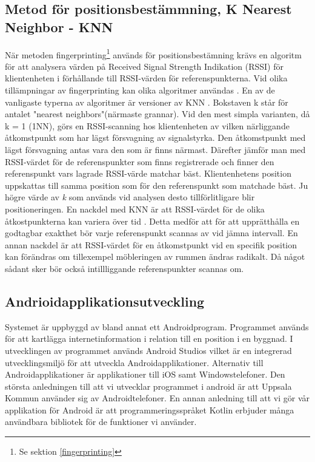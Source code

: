 \documentclass[swedish, a4paper,12pt]{article}
\begin{document}
\subsection{Metod för positionsbestämmning, K Nearest Neighbor - KNN}\label{KNN}
När metoden fingerprinting\footnote{Se sektion \ref{fingerprinting}} används för positionsbestämning krävs en algoritm för att analysera värden på Received Signal Strength Indikation (RSSI) för klientenheten i förhållande till RSSI-värden för referenspunkterna. Vid olika tillämpningar av fingerprinting kan olika algoritmer användas \cite{tian2013fingerprint}\cite{jun2018low}. En av de vanligaste typerna av algoritmer är versioner av KNN \cite{tian2013fingerprint}.
Bokstaven k står för antalet "nearest neighbors"(närmaste grannar). Vid den mest simpla varianten, då k = 1 (1NN), görs en RSSI-scanning hos klientenheten av vilken närliggande åtkomstpunkt som har lägst försvagning av signalstyrka. Den åtkomstpunkt med lägst försvagning antas vara den som är finns närmast. Därefter jämför man med RSSI-värdet för de referenspunkter som finns registrerade och finner den referenspunkt vars lagrade RSSI-värde matchar bäst. Klientenhetens position uppskattas till samma position som för den referenspunkt som matchade bäst.
Ju högre värde av \textit{k} som används vid analysen desto tillförlitligare blir positioneringen.\cite{yiu2017wireless}
En nackdel med KNN är att RSSI-värdet för de olika åtkostpunkterna kan variera över tid \cite{tian2013fingerprint}. Detta medför att för att upprätthålla en godtagbar exakthet bör varje referenspunkt scannas av vid jämna intervall.
En annan nackdel är att RSSI-värdet för en åtkomstpunkt vid en specifik position kan förändras om tillexempel möbleringen av rummen ändras radikalt. Då något sådant sker bör också intillliggande referenspunkter scannas om.

\subsection{Andrioidapplikationsutveckling}
Systemet är uppbyggd av bland annat ett Androidprogram. Programmet används för att kartlägga internetinformation i relation till en position i en byggnad. I utvecklingen av programmet används Android Studios vilket är en integrerad utvecklingsmiljö för att utveckla Androidapplikationer. Alternativ till Androidapplikationer är applikationer till iOS samt Windowstelefoner. Den största anledningen till att vi utvecklar programmet i android är att Uppsala Kommun använder sig av Androidtelefoner. En annan anledning till att vi gör vår applikation för Android är att programmeringsspråket Kotlin erbjuder många användbara bibliotek för de funktioner vi använder.
\end{document}
